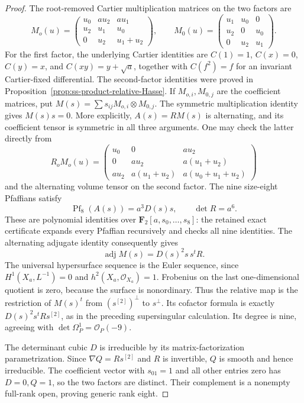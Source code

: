 \begin{proof}
The root-removed Cartier multiplication matrices on the two factors are
\[
 M_o(u)=\begin{pmatrix}
 u_0&a u_2&a u_1\\u_2&u_1&u_0\\0&u_2&u_1+u_2
 \end{pmatrix},\qquad
 M_0(u)=\begin{pmatrix}u_1&u_0&0\\u_2&0&u_0\\0&u_2&u_1\end{pmatrix}.
\]
For the first factor, the underlying Cartier identities are
$C(1)=1$, $C(x)=0$, $C(y)=x$, and $C(xy)=y+\sqrt a$,
together with $C(f^2)=f$ for an invariant Cartier-fixed
differential. The second-factor identities were proved in
Proposition~\ref{prop:ss-product-relative-Hasse}.
If $M_{o,i},M_{0,j}$ are the coefficient matrices, put
$M(s)=\sum s_{ij}M_{o,i}\otimes M_{0,j}$.
The symmetric multiplication identity gives $M(s)s=0$.
More explicitly, $A(s)=RM(s)$ is alternating, and its coefficient
tensor is symmetric in all three arguments. One may check the latter
directly from
\[
 R_oM_o(u)=\begin{pmatrix}
 u_0&0&a u_2\\
 0&a u_2&a(u_1+u_2)\\
 a u_2&a(u_1+u_2)&a(u_0+u_1+u_2)
 \end{pmatrix}
\]
and the alternating volume tensor on the second factor.
The nine size-eight Pfaffians satisfy
\[
                    \operatorname{Pf}_8(A(s))=a^3D(s)s,
                    \qquad \det R=a^6.
\]
These are polynomial identities over $\mathbf F_2[a,s_0,\ldots,s_8]$:
the retained exact certificate expands every Pfaffian recursively and
checks all nine identities. The alternating adjugate identity consequently
gives
\[
                  \operatorname{adj}M(s)=D(s)^2s\,s^tR.
\]
The universal hypersurface sequence is the Euler sequence, since
$H^1(X_a,L^{-1})=0$ and $h^2(X_a,\mathcal O_{X_a})=1$.
Frobenius on the last one-dimensional quotient is zero, because the
surface is nonordinary. Thus the relative map is the restriction of
$M(s)^t$ from $(s^{[2]})^\perp$ to $s^\perp$. Its cofactor formula
is exactly $D(s)^2s^tRs^{[2]}$, as in the preceding supersingular
calculation. Its degree is nine, agreeing with
$\det\Omega_P^1=\mathcal O_P(-9)$.

The determinant cubic $D$ is irreducible by its matrix-factorization
parametrization. Since
$\nabla Q=Rs^{[2]}$ and $R$ is invertible, $Q$ is smooth and hence
irreducible. The coefficient vector with $s_{01}=1$ and all other
entries zero has $D=0,Q=1$, so the two factors are distinct. Their
complement is a nonempty full-rank open, proving generic rank eight.


\end{proof}
